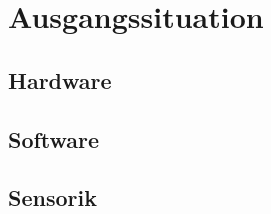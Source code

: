 \chapter{Ausgangssituation} 	\label{cha:Ausgangssituation}
\section{Hardware}				\label{sec:EVObotHardware}
\lipsum[1-1]	
\section{Software}				\label{sec:EVObotSoftware}
\lipsum[1-1]
\section{Sensorik}				\label{sec:EVObotSensorik}
\lipsum[1-1]
